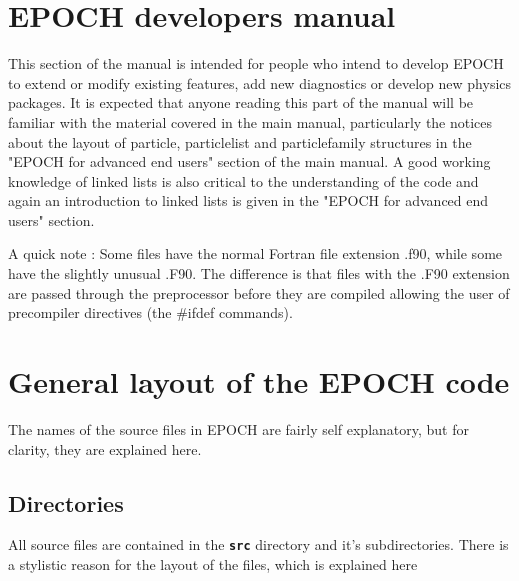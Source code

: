 \documentclass[12pt]{article}
\newcommand{\inlinecode}[1]{{\color{warwickred} \bf\texttt{#1}}}
\newcommand{\nEPOCH}{{\color{warwickdark}\fontfamily{phv}\selectfont EPOCH}}
\newcommand{\EPOCH}{{\nEPOCH} }
\begin{document}


\section{\EPOCH developers manual}
This section of the manual is intended for people who intend to develop \EPOCH
to extend or modify existing features, add new diagnostics or develop new
physics packages. It is expected that anyone reading this part of the manual
will be familiar with the material covered in the main manual, particularly
the notices about the layout of particle, particlelist and particlefamily
structures in the "\EPOCH for advanced end users" section of the main
manual. A good working knowledge of linked lists is also critical to the
understanding of the code and again an introduction to linked lists is given
in the "\EPOCH for advanced end users" section.

A quick note : Some files have the normal Fortran file extension .f90, while
some have the slightly unusual .F90. The difference is that files with the
.F90 extension are passed through the preprocessor before they are compiled
allowing the user of precompiler directives (the \#ifdef commands).

\section{General layout of the \EPOCH code}

The names of the source files in \EPOCH are fairly self explanatory, but for
clarity, they are explained here.

\subsection{Directories}
All source files are contained in the \inlinecode{src} directory and it's
subdirectories. There is a stylistic reason for the layout of the files, which
is explained here
\end{document}
